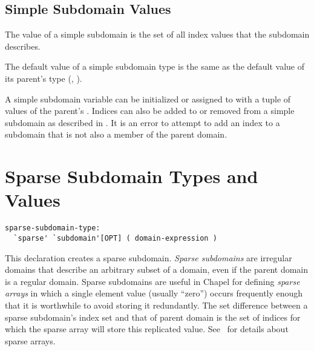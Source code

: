 \subsection{Simple Subdomain Values}

The value of a simple subdomain is the set of all index values
that the subdomain describes.


The default value of a simple subdomain type is the same as the default value
of its parent's type
(, ).

A simple subdomain variable can be initialized or assigned to
with a tuple of values of the parent's .
Indices can also be added to or removed from a simple subdomain
as described in .
It is an error to attempt to add an index to a subdomain that is not also
a member of the parent domain.


\section{Sparse Subdomain Types and Values}
\label{Sparse_Subdomain_Types_and_Values}

\begin{syntax}
\begin{verbatim}
sparse-subdomain-type:
  `sparse' `subdomain'[OPT] ( domain-expression )
\end{verbatim}
\end{syntax}

This declaration creates a sparse subdomain.
 \emph{Sparse subdomains} are irregular domains that describe an
arbitrary subset of a domain, even if the parent domain is a regular
domain.  Sparse subdomains are useful in Chapel for
defining \emph{sparse arrays} in which a single element value (usually ``zero'')
 occurs
frequently enough that it is worthwhile to avoid storing it
redundantly.  The set difference between a sparse subdomain's index set
and that of parent domain is the set of indices for which the
sparse array will store this replicated value.
See~ for details about sparse arrays.

